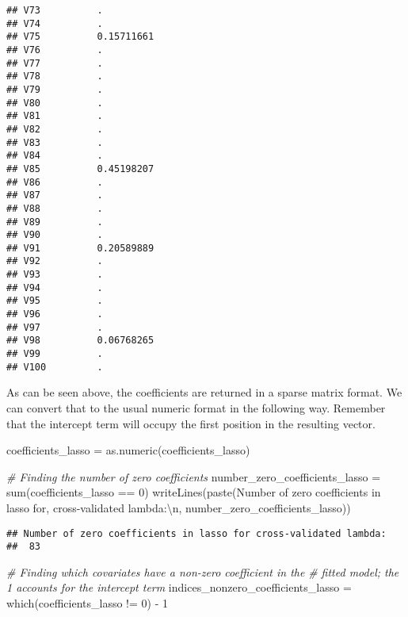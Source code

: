\documentclass[
]{book}
\newenvironment{Shaded}{\begin{snugshade}}{\end{snugshade}}
\newcommand{\CommentTok}[1]{\textcolor[rgb]{0.56,0.35,0.01}{\textit{#1}}}
\newcommand{\DecValTok}[1]{\textcolor[rgb]{0.00,0.00,0.81}{#1}}
\newcommand{\FunctionTok}[1]{\textcolor[rgb]{0.00,0.00,0.00}{#1}}
\newcommand{\NormalTok}[1]{#1}
\newcommand{\OtherTok}[1]{\textcolor[rgb]{0.56,0.35,0.01}{#1}}
\newcommand{\SpecialCharTok}[1]{\textcolor[rgb]{0.00,0.00,0.00}{#1}}
\newcommand{\StringTok}[1]{\textcolor[rgb]{0.31,0.60,0.02}{#1}}
\begin{document}
\begin{verbatim}
## V73          .         
## V74          .         
## V75          0.15711661
## V76          .         
## V77          .         
## V78          .         
## V79          .         
## V80          .         
## V81          .         
## V82          .         
## V83          .         
## V84          .         
## V85          0.45198207
## V86          .         
## V87          .         
## V88          .         
## V89          .         
## V90          .         
## V91          0.20589889
## V92          .         
## V93          .         
## V94          .         
## V95          .         
## V96          .         
## V97          .         
## V98          0.06768265
## V99          .         
## V100         .
\end{verbatim}

As can be seen above, the coefficients are returned in a sparse matrix format. We can convert that to the usual numeric format in the following way. Remember that the intercept term will occupy the first position in the resulting vector.

\begin{Shaded}
\begin{Highlighting}[]
\NormalTok{coefficients\_lasso }\OtherTok{=} \FunctionTok{as.numeric}\NormalTok{(coefficients\_lasso)}

\CommentTok{\# Finding the number of zero coefficients}
\NormalTok{number\_zero\_coefficients\_lasso }\OtherTok{=} \FunctionTok{sum}\NormalTok{(coefficients\_lasso }\SpecialCharTok{==} \DecValTok{0}\NormalTok{)}
\FunctionTok{writeLines}\NormalTok{(}\FunctionTok{paste}\NormalTok{(}\StringTok{\textquotesingle{}Number of zero coefficients in lasso for\textquotesingle{}}\NormalTok{,}
                 \StringTok{\textquotesingle{}cross{-}validated lambda:}\SpecialCharTok{\textbackslash{}n}\StringTok{\textquotesingle{}}\NormalTok{,}
\NormalTok{                 number\_zero\_coefficients\_lasso))}
\end{Highlighting}
\end{Shaded}

\begin{verbatim}
## Number of zero coefficients in lasso for cross-validated lambda:
##  83
\end{verbatim}

\begin{Shaded}
\begin{Highlighting}[]
\CommentTok{\# Finding which covariates have a non{-}zero coefficient in the}
\CommentTok{\# fitted model; the \textquotesingle{}{-}1\textquotesingle{} accounts for the intercept term}
\NormalTok{indices\_nonzero\_coefficients\_lasso }\OtherTok{=}
  \FunctionTok{which}\NormalTok{(coefficients\_lasso }\SpecialCharTok{!=} \DecValTok{0}\NormalTok{) }\SpecialCharTok{{-}} \DecValTok{1}
\end{Highlighting}
\end{Shaded}
\end{document}
